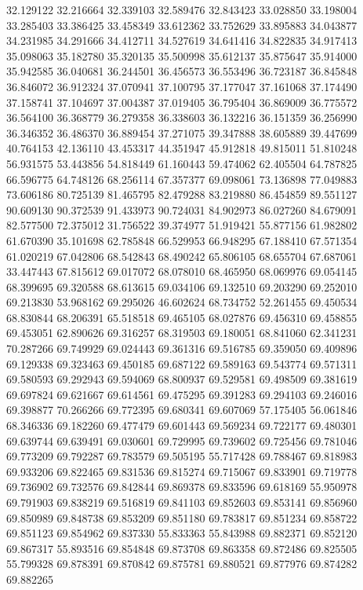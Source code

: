 32.129122
32.216664
32.339103
32.589476
32.843423
33.028850
33.198004
33.285403
33.386425
33.458349
33.612362
33.752629
33.895883
34.043877
34.231985
34.291666
34.412711
34.527619
34.641416
34.822835
34.917413
35.098063
35.182780
35.320135
35.500998
35.612137
35.875647
35.914000
35.942585
36.040681
36.244501
36.456573
36.553496
36.723187
36.845848
36.846072
36.912324
37.070941
37.100795
37.177047
37.161068
37.174490
37.158741
37.104697
37.004387
37.019405
36.795404
36.869009
36.775572
36.564100
36.368779
36.279358
36.338603
36.132216
36.151359
36.256990
36.346352
36.486370
36.889454
37.271075
39.347888
38.605889
39.447699
40.764153
42.136110
43.453317
44.351947
45.912818
49.815011
51.810248
56.931575
53.443856
54.818449
61.160443
59.474062
62.405504
64.787825
66.596775
64.748126
68.256114
67.357377
69.098061
73.136898
77.049883
73.606186
80.725139
81.465795
82.479288
83.219880
86.454859
89.551127
90.609130
90.372539
91.433973
90.724031
84.902973
86.027260
84.679091
82.577500
72.375012
31.756522
39.374977
51.919421
55.877156
61.982802
61.670390
35.101698
62.785848
66.529953
66.948295
67.188410
67.571354
61.020219
67.042806
68.542843
68.490242
65.806105
68.655704
67.687061
33.447443
67.815612
69.017072
68.078010
68.465950
68.069976
69.054145
68.399695
69.320588
68.613615
69.034106
69.132510
69.203290
69.252010
69.213830
53.968162
69.295026
46.602624
68.734752
52.261455
69.450534
68.830844
68.206391
65.518518
69.465105
68.027876
69.456310
69.458855
69.453051
62.890626
69.316257
68.319503
69.180051
68.841060
62.341231
70.287266
69.749929
69.024443
69.361316
69.516785
69.359050
69.409896
69.129338
69.323463
69.450185
69.687122
69.589163
69.543774
69.571311
69.580593
69.292943
69.594069
68.800937
69.529581
69.498509
69.381619
69.697824
69.621667
69.614561
69.475295
69.391283
69.294103
69.246016
69.398877
70.266266
69.772395
69.680341
69.607069
57.175405
56.061846
68.346336
69.182260
69.477479
69.601443
69.569234
69.722177
69.480301
69.639744
69.639491
69.030601
69.729995
69.739602
69.725456
69.781046
69.773209
69.792287
69.783579
69.505195
55.717428
69.788467
69.818983
69.933206
69.822465
69.831536
69.815274
69.715067
69.833901
69.719778
69.736902
69.732576
69.842844
69.869378
69.833596
69.618169
55.950978
69.791903
69.838219
69.516819
69.841103
69.852603
69.853141
69.856960
69.850989
69.848738
69.853209
69.851180
69.783817
69.851234
69.858722
69.851123
69.854962
69.837330
55.833363
55.843988
69.882371
69.852120
69.867317
55.893516
69.854848
69.873708
69.863358
69.872486
69.825505
55.799328
69.878391
69.870842
69.875781
69.880521
69.877976
69.874282
69.882265
